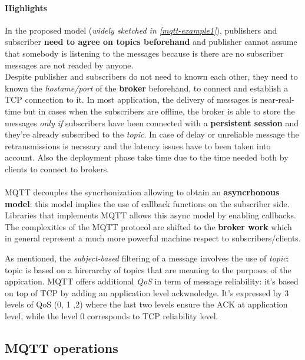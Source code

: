 \documentclass[10pt,a4paper]{report}
\theoremstyle{definition}
\begin{document}
\paragraph{Highlights}\label{sec:highlights}
In the proposed model (\textit{widely sketched in \ref{mqtt-example1}}), publishers and subscriber \textbf{need to agree on topics beforehand} and publisher cannot assume that somebody is listening to the messages because is there are no subscriber messages are not readed by anyone.\\
Despite publisher and subscribers do not need to known each other, they need to known the \textit{hostame/port} of the \textbf{broker} beforehand, to connect and establish a TCP connection to it.
In most application, the delivery of messages is near-real-time but in cases when the subscribers are offline, the broker is able to store the messages \textit{only if} subscribers have been connected with a \textbf{persistent session} and they're already subscribed to the \textit{topic}.  In case of delay or unreliable message the retransmissions is necssary and the latency issues have to been taken into account.
Also the deployment phase take time due to the time needed both by clients to connect to brokers.\\\\
MQTT decouples the syncrhonization allowing to obtain an \textbf{asyncrhonous model}: this model implies the use of callback functions on the subscriber side. Libraries that implements MQTT allows this async model by enabling callbacks.
The complexities of the MQTT protocol are shifted to the \textbf{broker work} which in general represent a much more powerful machine respect to subscribers/clients.

As mentioned, the \textit{subject-based} filtering of a message involves the use of \textit{topic}: topic is based on a hirerarchy of topics that are meaning to the purposes of the appication.
MQTT offers additional \textit{QoS} in term of message reliability: it's based on top of TCP by adding an application level ackwnoledge. It's expressed by 3 levels of QoS (0, 1 ,2) where the last two levels ensure the ACK at application level, while the level $0$ corresponds to TCP reliability level.


\subsection{MQTT operations}
\end{document}
